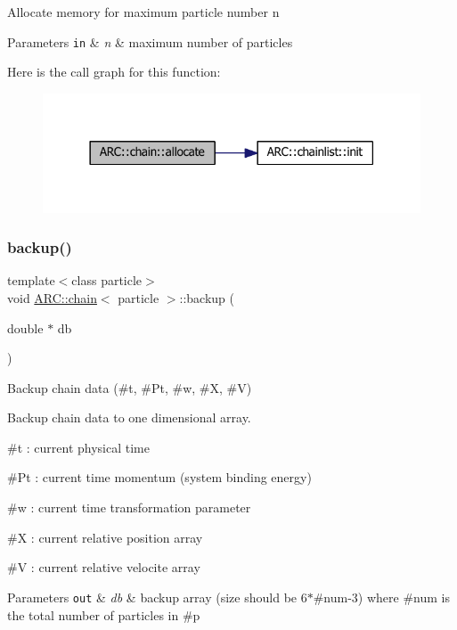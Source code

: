 Allocate memory for maximum particle number n 
\begin{DoxyParams}[1]{Parameters}
\mbox{\tt in}  & {\em n} & maximum number of particles \\
\hline
\end{DoxyParams}
Here is the call graph for this function\+:
\nopagebreak
\begin{figure}[H]
\begin{center}
\leavevmode
\includegraphics[width=318pt]{classARC_1_1chain_ad0abd7b957e9d88ad2f1823f06d28a4a_cgraph}
\end{center}
\end{figure}
\hypertarget{classARC_1_1chain_a587009b6c6db0490c0f335aba732d77a}{}\label{classARC_1_1chain_a587009b6c6db0490c0f335aba732d77a} 
\subsubsection{\texorpdfstring{backup()}{backup()}}
{\footnotesize\ttfamily template$<$class particle$>$ \\
void \hyperlink{classARC_1_1chain}{A\+R\+C\+::chain}$<$ particle $>$\+::backup (\begin{DoxyParamCaption}\item[{double $\ast$}]{db }\end{DoxyParamCaption})\hspace{0.3cm}{\ttfamily [inline]}}



Backup chain data (\#t, \#\+Pt, \#w, \#X, \#V) 

Backup chain data to one dimensional array.
\begin{DoxyItemize}
\item \#t \+: current physical time
\item \#\+Pt \+: current time momentum (system binding energy)
\item \#w \+: current time transformation parameter
\item \#X \+: current relative position array
\item \#V \+: current relative velocite array 
\begin{DoxyParams}[1]{Parameters}
\mbox{\tt out}  & {\em db} & backup array (size should be 6$\ast$\#num-\/3) where \#num is the total number of particles in \#p \\
\hline
\end{DoxyParams}

\end{DoxyItemize}\hypertarget{classARC_1_1chain_a4e46df0f8b24f515715d95f6cc871a0d}{}\label{classARC_1_1chain_a4e46df0f8b24f515715d95f6cc871a0d} 
